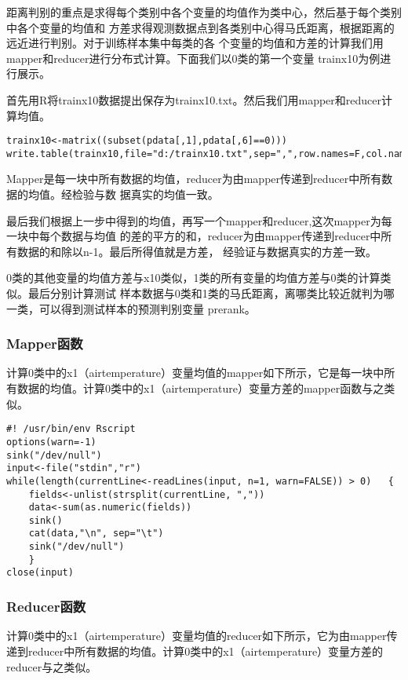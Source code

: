 距离判别的重点是求得每个类别中各个变量的均值作为类中心，然后基于每个类别中各个变量的均值和
方差求得观测数据点到各类别中心得马氏距离，根据距离的远近进行判别。对于训练样本集中每类的各
个变量的均值和方差的计算我们用mapper和reducer进行分布式计算。下面我们以0类的第一个变量
trainx10为例进行展示。

首先用R将trainx10数据提出保存为trainx10.txt。然后我们用mapper和reducer计算均值。

\begin{lstlisting}
trainx10<-matrix((subset(pdata[,1],pdata[,6]==0)))
write.table(trainx10,file="d:/trainx10.txt",sep=",",row.names=F,col.names=F)
\end{lstlisting}

Mapper是每一块中所有数据的均值，reducer为由mapper传递到reducer中所有数据的均值。经检验与数
据真实的均值一致。

最后我们根据上一步中得到的均值，再写一个mapper和reducer,这次mapper为每一块中每个数据与均值
的差的平方的和，reducer为由mapper传递到reducer中所有数据的和除以n-1。最后所得值就是方差，
经验证与数据真实的方差一致。

0类的其他变量的均值方差与x10类似，1类的所有变量的均值方差与0类的计算类似。最后分别计算测试
样本数据与0类和1类的马氏距离，离哪类比较近就判为哪一类，可以得到测试样本的预测判别变量
prerank。

\subsubsection{Mapper函数}\label{mapperux51fdux6570}

计算0类中的x1（airtemperature）变量均值的mapper如下所示，它是每一块中所有数据的均值。计算0类中的x1（airtemperature）变量方差的mapper函数与之类似。

\begin{lstlisting}
#! /usr/bin/env Rscript
options(warn=-1)
sink("/dev/null")
input<-file("stdin","r")
while(length(currentLine<-readLines(input, n=1, warn=FALSE)) > 0)   {
    fields<-unlist(strsplit(currentLine, ","))
    data<-sum(as.numeric(fields))
    sink()
    cat(data,"\n", sep="\t")
    sink("/dev/null")
    }
close(input)
\end{lstlisting}

\subsubsection{Reducer函数}\label{reducerux51fdux6570}

计算0类中的x1（airtemperature）变量均值的reducer如下所示，它为由mapper传递到reducer中所有数据的均值。计算0类中的x1（airtemperature）变量方差的reducer与之类似。


